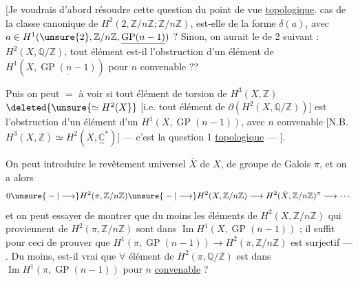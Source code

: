 [Je voudrais d'abord résoudre cette question du point de vue \uline{topologique}.  cas de la classe canonique de $H^2(2,\mathbb{Z}/n\mathbb{Z};\mathbb{Z}/n\mathbb{Z})$, est-elle de la forme $\delta(a)$, avec $a\in H^1(\unsure{2},\mathbb{Z}/n\mathbb{Z},\underline{\operatorname{GP}(n-1)})$ ?
Sinon, on aurait le  de 2 suivant : $H^2(X,\mathbb{Q}/\mathbb{Z})$, tout élément est-il l'obstruction d'un élément de $H^1(X,\underline{\operatorname{GP}(n-1)})$ pour $n$ convenable ??

Puis on peut $=$  à voir si tout élément de torsion de $H^3(X,\mathbb{Z})$ $\deleted{\unsure{\simeq H^2(X}}$ \deleted{\unsure{$\delta$}} [i.e. tout élément de $\partial(H^2(X,\mathbb{Q}/\mathbb{Z}))$] est l'obstruction d'un élément d'un $H^1(X,\operatorname{GP}(n-1))$, avec $n$ convenable [N.B. $H^3(X,\mathbb{Z})\simeq H^2(X,\underset{\sim}{\mathbb{C}}^*)$] --- c'est la question 1 \uline{topologique} --- ].

On peut introduire le revêtement universel $\bar X$ de $X$, de groupe de Galois $\pi$, et on a alors
\[
0\unsure{{}-{ }|\longrightarrow}H^2(\pi,\mathbb{Z}/n\mathbb{Z})\unsure{{}-{ }|\longrightarrow}H^2(X,\mathbb{Z}/n\mathbb{Z})\longrightarrow H^2(\bar X,\mathbb{Z}/n\mathbb{Z})^\pi\longrightarrow\cdots
\]
et on peut essayer de montrer que du moins les éléments de $H^2(X,\mathbb{Z}/n\mathbb{Z})$ qui proviennent de $H^2(\pi,\mathbb{Z}/n\mathbb{Z})$ sont dans $\operatorname{Im}H^1(X,\operatorname{GP}(n-1))$ ;  il suffit pour ceci de prouver que $H^1(\pi,\operatorname{GP}(n-1))\to H^2(\pi,\mathbb{Z}/n\mathbb{Z})$ est surjectif --- . Du moins, est-il vrai que $\forall$ élément de $H^2(\pi,\mathbb{Q}/\mathbb{Z})$ est dans $\operatorname{Im}H^1(\pi,\operatorname{GP}(n-1))$ pour $n$ \uline{convenable} ?
